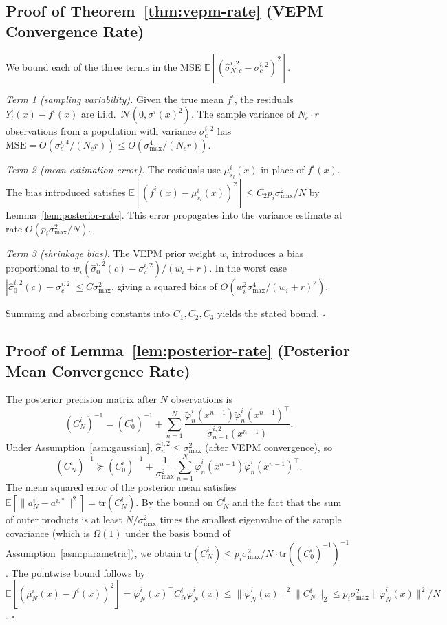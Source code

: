 \documentclass[12pt]{article}
\theoremstyle{plain}
\theoremstyle{definition}
\theoremstyle{remark}
\begin{document}
\subsection{Proof of Theorem~\ref{thm:vepm-rate} (VEPM Convergence Rate)}\label{app:proof_vepm_rate}

We bound each of the three terms in the MSE
$\mathbb{E}[(\hat{\sigma}^{i,2}_{N,c} - \sigma^{i,2}_c)^2]$.

\emph{Term 1 (sampling variability).}
Given the true mean $f^i$, the residuals $Y^i_l(x) - f^i(x)$ are i.i.d.\
$\mathcal{N}(0, \sigma^i(x)^2)$.  The sample variance of $N_c \cdot r$
observations from a population with variance $\sigma^{i,2}_c$ has
$\mathrm{MSE} = O(\sigma^{i,4}_c / (N_c r)) \leq O(\sigma^4_{\max}/(N_c r))$.

\emph{Term 2 (mean estimation error).}
The residuals use $\mu^i_{s_l}(x)$ in place of $f^i(x)$.  The bias introduced
satisfies
$\mathbb{E}[(f^i(x) - \mu^i_{s_l}(x))^2] \leq C_2 p_i \sigma^2_{\max} / N$
by Lemma~\ref{lem:posterior-rate}.  This error propagates into the variance
estimate at rate $O(p_i \sigma^2_{\max}/N)$.

\emph{Term 3 (shrinkage bias).}
The VEPM prior weight $w_i$ introduces a bias proportional to
$w_i(\hat{\sigma}^{i,2}_0(c) - \sigma^{i,2}_c)/(w_i + r)$.
In the worst case $|\hat{\sigma}^{i,2}_0(c) - \sigma^{i,2}_c| \leq C \sigma^2_{\max}$,
giving a squared bias of $O(w_i^2 \sigma^4_{\max}/(w_i+r)^2)$.

Summing and absorbing constants into $C_1, C_2, C_3$ yields the stated bound.
\hfill$\square$

\subsection{Proof of Lemma~\ref{lem:posterior-rate} (Posterior Mean Convergence Rate)}\label{app:proof_posterior_rate}

The posterior precision matrix after $N$ observations is
\[
  (C^i_N)^{-1} = (C^i_0)^{-1} + \sum_{n=1}^N
  \frac{\tilde{\varphi}^i_n(x^{n-1}) \tilde{\varphi}^i_n(x^{n-1})^\top}
       {\hat{\sigma}^{i,2}_{n-1}(x^{n-1})}.
\]
Under Assumption~\ref{asm:gaussian}, $\hat{\sigma}^{i,2}_n \leq \sigma^2_{\max}$
(after VEPM convergence), so
\[
  (C^i_N)^{-1} \succeq (C^i_0)^{-1}
  + \frac{1}{\sigma^2_{\max}} \sum_{n=1}^N
  \tilde{\varphi}^i_n(x^{n-1}) \tilde{\varphi}^i_n(x^{n-1})^\top.
\]
The mean squared error of the posterior mean satisfies
$\mathbb{E}[\|a^i_N - a^{i,*}\|^2] = \mathrm{tr}(C^i_N)$.
By the bound on $C^i_N$ and the fact that the sum of outer products is at
least $N/\sigma^2_{\max}$ times the smallest eigenvalue of the sample
covariance (which is $\Omega(1)$ under the basis bound of
Assumption~\ref{asm:parametric}), we obtain
$\mathrm{tr}(C^i_N) \leq p_i \sigma^2_{\max} / N \cdot \mathrm{tr}((C^i_0)^{-1})^{-1}$.
The pointwise bound follows by
$\mathbb{E}[(\mu^i_N(x) - f^i(x))^2]
= \tilde{\varphi}^i_N(x)^\top C^i_N \tilde{\varphi}^i_N(x)
\leq \|\tilde{\varphi}^i_N(x)\|^2 \|C^i_N\|_2
\leq p_i \sigma^2_{\max} \|\tilde{\varphi}^i_N(x)\|^2 / N$.
\hfill$\square$
\end{document}
